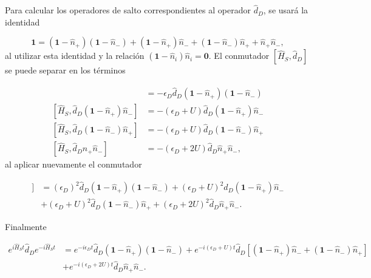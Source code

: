 \begin{appendixs}
Para calcular los operadores de salto correspondientes al operador $\hat{d}_{D}$, se usará la identidad

\begin{equation*}
    \textbf{1} = (\textbf{1} - \hat{n}_{+})(\textbf{1}-\hat{n}_{-}) + (\textbf{1} - \hat{n}_{+})\hat{n}_{-} + (\textbf{1} - \hat{n}_{-})\hat{n}_{+} + \hat{n}_{+}\hat{n}_{-},
\end{equation*}
al utilizar esta identidad y la relación $(\textbf{1} - \hat{n}_{i})\hat{n}_{i} = \textbf{0}$. El conmutador $[\hat{H}_{S},\hat{d}_{D}]$ se puede separar en los términos

\begin{align*}
    [\hat{H}_{S},\hat{d}_{D}(\textbf{1}-\hat{n}_{+})(\textbf{1} - \hat{n}_{-})] & = - \epsilon_{D}\hat{d}_{D}(\textbf{1}-\hat{n}_{+})(\textbf{1} - \hat{n}_{-}) \\
    [\hat{H}_{S},\hat{d}_{D}(\textbf{1}-\hat{n}_{+})\hat{n}_{-}] & = - (\epsilon_{D} + U)\hat{d}_{D}(\textbf{1} - \hat{n}_{+})\hat{n}_{-} \\
    [\hat{H}_{S},\hat{d}_{D}(\textbf{1}-\hat{n}_{-})\hat{n}_{+}] & = - (\epsilon_{D} + U)\hat{d}_{D}(\textbf{1} - \hat{n}_{-})\hat{n}_{+} \\
    [\hat{H}_{S},\hat{d}_{D}\hat{n}_{+}\hat{n}_{-}] & = - (\epsilon_{D} + 2U)\hat{d}_{D}\hat{n}_{+}\hat{n}_{-}, 
\end{align*}
al aplicar nuevamente el conmutador

\begin{align*}
    [\hat{H}_{S},[\hat{H}_{S},\hat{d}_{D}]] & = (\epsilon_{D})^{2}\hat{d}_{D}(\textbf{1} - \hat{n}_{+}) (\textbf{1} - \hat{n}_{-}) + (\epsilon_{D} + U)^{2}\hat{d}_{D}(\textbf{1} - \hat{n}_{+})\hat{n}_{-} \\
        & + (\epsilon_{D}+U)^{2}\hat{d}_{D}(\textbf{1} - \hat{n}_{-})\hat{n}_{+} + (\epsilon_{D} + 2U)^{2}\hat{d}_{D}\hat{n}_{+}\hat{n}_{-}.
\end{align*}

Finalmente 

\begin{align*}
    e^{i \hat{H}_{S}t}\hat{d}_{D}e^{-i\hat{H}_{S}t}  & = e^{-i\epsilon_{D}t} \hat{d}_{D}(\textbf{1} - \hat{n}_{+}) (\textbf{1} - \hat{n}_{-}) +  e^{-i(\epsilon_{D}+U)t} \hat{d}_{D}[(\textbf{1} - \hat{n}_{+})\hat{n}_{-} + (\textbf{1} - \hat{n}_{-})\hat{n}_{+}] \\
    & + e^{-i(\epsilon_{D} + 2U)t}\hat{d}_{D} \hat{n}_{+}\hat{n}_{-}.
\end{align*}


\end{appendixs}
